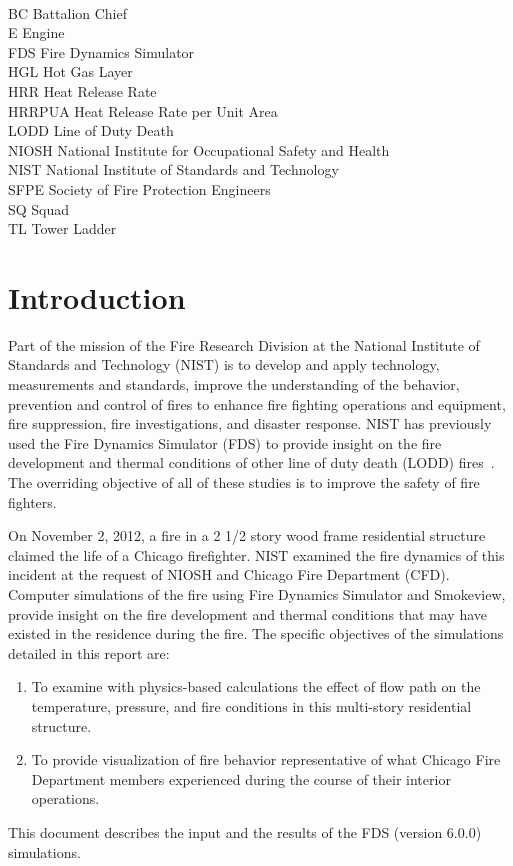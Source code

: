 \documentclass[11pt,oneside]{book}
\begin{document}
\begin{tabbing}
\hspace{1.5in} \= \\
BC \> Battalion Chief \\
E \> Engine \\
FDS \> Fire Dynamics Simulator \\
HGL \> Hot Gas Layer \\
HRR \> Heat Release Rate \\
HRRPUA \> Heat Release Rate per Unit Area \\
LODD \> Line of Duty Death \\
NIOSH \> National Institute for Occupational Safety and  Health \\
NIST \> National Institute of Standards and Technology \\
SFPE \> Society of Fire Protection Engineers \\
SQ \> Squad \\
TL \> Tower Ladder \\
\end{tabbing}

\mainmatter

\chapter{Introduction}
Part of the mission of the Fire Research Division at the National Institute of Standards and Technology (NIST) is to develop and apply technology, measurements and standards, improve the understanding of the behavior, prevention and control of fires to enhance fire fighting operations and equipment, fire suppression, fire investigations, and disaster response. NIST has previously used the Fire Dynamics Simulator (FDS) to provide insight on the fire development and thermal conditions of other line of duty death (LODD) fires~\cite{Madrzykowski:1,Iowa,Texas,Cook_County,Grosshandler:Station,Bryner:Charleston,barowy:texas}. The overriding objective of all of these studies is to improve the safety of fire fighters.

On November 2, 2012, a fire in a 2 1/2 story wood frame residential structure claimed the life of a Chicago firefighter. NIST examined the fire dynamics of this incident at the request of NIOSH and Chicago Fire Department (CFD). Computer simulations of the fire using Fire Dynamics Simulator and Smokeview, provide insight on the fire development and thermal conditions that may have existed in the residence during the fire. The specific objectives of the simulations detailed in this report are: 
\begin{enumerate}
\item To examine with physics-based calculations the effect of flow path on the temperature, pressure, and fire conditions in this multi-story residential structure.
\item To provide visualization of fire behavior representative of what Chicago Fire Department members experienced during the course of their interior operations.
\end{enumerate}
This document describes the input and the results of the FDS (version 6.0.0) simulations.
\end{document}
